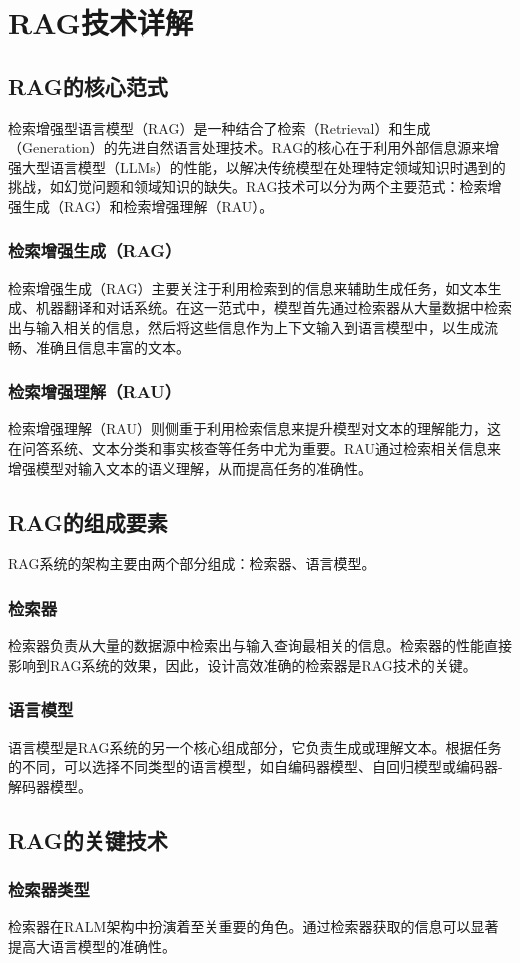 \chapter{RAG技术详解}
\section{RAG的核心范式}
检索增强型语言模型（RAG）是一种结合了检索（Retrieval）和生成（Generation）的先进自然语言处理技术。RAG的核心在于利用外部信息源来增强大型语言模型（LLMs）的性能，以解决传统模型在处理特定领域知识时遇到的挑战，如幻觉问题和领域知识的缺失。RAG技术可以分为两个主要范式：检索增强生成（RAG）和检索增强理解（RAU）。
\subsection{检索增强生成（RAG）}
检索增强生成（RAG）主要关注于利用检索到的信息来辅助生成任务，如文本生成、机器翻译和对话系统。在这一范式中，模型首先通过检索器从大量数据中检索出与输入相关的信息，然后将这些信息作为上下文输入到语言模型中，以生成流畅、准确且信息丰富的文本。
\subsection{检索增强理解（RAU）}
检索增强理解（RAU）则侧重于利用检索信息来提升模型对文本的理解能力，这在问答系统、文本分类和事实核查等任务中尤为重要。RAU通过检索相关信息来增强模型对输入文本的语义理解，从而提高任务的准确性。
\section{RAG的组成要素}
RAG系统的架构主要由两个部分组成：检索器、语言模型。
\subsection{检索器}
检索器负责从大量的数据源中检索出与输入查询最相关的信息。检索器的性能直接影响到RAG系统的效果，因此，设计高效准确的检索器是RAG技术的关键。
\subsection{语言模型}
语言模型是RAG系统的另一个核心组成部分，它负责生成或理解文本。根据任务的不同，可以选择不同类型的语言模型，如自编码器模型、自回归模型或编码器-解码器模型。
\section{RAG的关键技术}
\subsection{检索器类型}
检索器在RALM架构中扮演着至关重要的角色。通过检索器获取的信息可以显著提高大语言模型的准确性。
